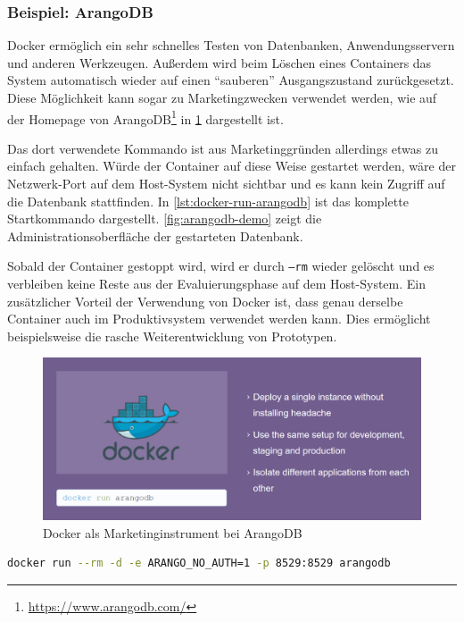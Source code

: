 \subsubsection{Beispiel: ArangoDB}
Docker ermöglich ein sehr schnelles Testen von Datenbanken, Anwendungsservern und anderen Werkzeugen.
Außerdem wird beim Löschen eines Containers das System automatisch wieder auf einen "`sauberen"' Ausgangszustand zurückgesetzt.
Diese Möglichkeit kann sogar zu Marketingzwecken verwendet werden, wie auf der Homepage von ArangoDB\footnote{\url{https://www.arangodb.com/}} in \cref{fig:arangodb-docker-marketing} dargestellt ist.

Das dort verwendete Kommando ist aus Marketinggründen allerdings etwas zu einfach gehalten.
Würde der Container auf diese Weise gestartet werden, wäre der Netzwerk-Port auf dem Host-System nicht sichtbar und es kann kein Zugriff auf die Datenbank stattfinden.
In \cref{lst:docker-run-arangodb} ist das komplette Startkommando dargestellt.
\cref{fig:arangodb-demo} zeigt die Administrationsoberfläche der gestarteten Datenbank.

Sobald der Container gestoppt wird, wird er durch \texttt{--rm} wieder gelöscht und es verbleiben keine Reste aus der Evaluierungsphase auf dem Host-System.
Ein zusätzlicher Vorteil der Verwendung von Docker ist, dass genau derselbe Container auch im Produktivsystem verwendet werden kann.
Dies ermöglicht beispielsweise die rasche Weiterentwicklung von Prototypen.

\begin{figure}[htbp]
    \centering
    \includegraphics[width=0.7\linewidth,clip]{images/arangodb-docker-marketing}
    \caption{Docker als Marketinginstrument bei ArangoDB}
\label{fig:arangodb-docker-marketing}
\end{figure}

\begin{lstlisting}[caption=Docker-Kommando zum Starten von ArangoDB, language=bash, label=lst:docker-run-arangodb]
docker run --rm -d -e ARANGO_NO_AUTH=1 -p 8529:8529 arangodb
\end{lstlisting}

